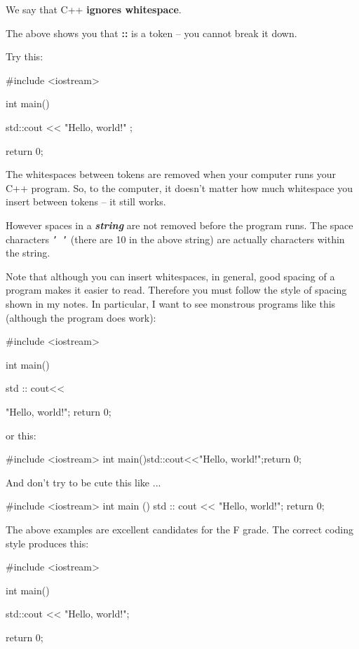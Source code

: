 We say that C++ \textbf{ignores whitespace}. 





The above 
shows you that \textbf{::} is a token – you cannot break it down.




Try this:
\begin{console}
#include <iostream>

int main()
{
    std::cout << "Hello,          world!\n" ;

    return 0;
}
\end{console}


The whitespaces between tokens are removed when your computer runs your C++ program. So, to the computer, it doesn't matter how much whitespace you insert between tokens -- it still works.

However spaces in a \textit{\textbf{string}} 
are not removed before the program runs. 
The space characters \texttt{' '}
(there are 10 in the above string) are actually characters within the string.

Note that although you can insert whitespaces, 
in general, good spacing of a program makes it easier to read. 
Therefore you must follow the style of spacing shown in my notes. 
In particular, I 
 want to see monstrous programs like this 
(although the program does work):
\begin{console}
#include <iostream>

int                        main(){std
::
                    cout<<

"Hello, world!\n"; return 0; }
\end{console}
or this: 
\begin{console}
#include <iostream>
int main(){std::cout<<"Hello, world!\n";return 0;}
\end{console}
And don't try to be cute this like ...
\begin{console}
#include <iostream>
int
 main
  ()
   {
    std
     ::
      cout
       <<
        "Hello, world!\n"; 
         return 0; 
          }
\end{console}
The above examples are excellent candidates for the F grade. 
The correct coding style produces this:
\begin{console}
#include <iostream>

int main()
{
    std::cout << "Hello, world!\n";

    return 0;
}
\end{console}

